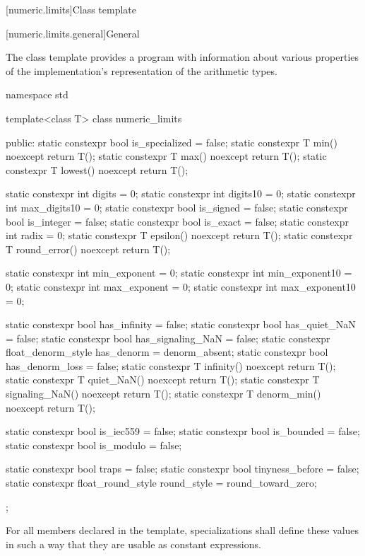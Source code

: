 [numeric.limits]{Class template }

[numeric.limits.general]{General}

\pnum
The
%
class template provides a \Cpp{} program with information about various properties of
the implementation's representation of the
arithmetic types.

%
\begin{codeblock}
namespace std {
  template<class T> class numeric_limits {
  public:
    static constexpr bool is_specialized = false;
    static constexpr T min() noexcept { return T(); }
    static constexpr T max() noexcept { return T(); }
    static constexpr T lowest() noexcept { return T(); }

    static constexpr int  digits = 0;
    static constexpr int  digits10 = 0;
    static constexpr int  max_digits10 = 0;
    static constexpr bool is_signed = false;
    static constexpr bool is_integer = false;
    static constexpr bool is_exact = false;
    static constexpr int  radix = 0;
    static constexpr T epsilon() noexcept { return T(); }
    static constexpr T round_error() noexcept { return T(); }

    static constexpr int  min_exponent = 0;
    static constexpr int  min_exponent10 = 0;
    static constexpr int  max_exponent = 0;
    static constexpr int  max_exponent10 = 0;

    static constexpr bool has_infinity = false;
    static constexpr bool has_quiet_NaN = false;
    static constexpr bool has_signaling_NaN = false;
    static constexpr float_denorm_style has_denorm = denorm_absent;
    static constexpr bool has_denorm_loss = false;
    static constexpr T infinity() noexcept { return T(); }
    static constexpr T quiet_NaN() noexcept { return T(); }
    static constexpr T signaling_NaN() noexcept { return T(); }
    static constexpr T denorm_min() noexcept { return T(); }

    static constexpr bool is_iec559 = false;
    static constexpr bool is_bounded = false;
    static constexpr bool is_modulo = false;

    static constexpr bool traps = false;
    static constexpr bool tinyness_before = false;
    static constexpr float_round_style round_style = round_toward_zero;
  };
}
\end{codeblock}

\pnum
For all members declared
 
in the
template, specializations shall define these values in such a way
that they are usable as
constant expressions.

